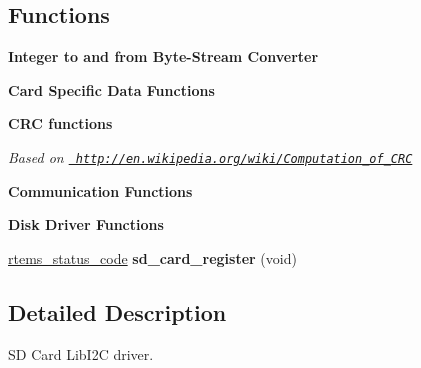 \subsection*{Functions}
\begin{Indent}\textbf{ Integer to and from Byte-\/\+Stream Converter}\par
\end{Indent}
\begin{Indent}\textbf{ Card Specific Data Functions}\par
\end{Indent}
\begin{Indent}\textbf{ C\+RC functions}\par
{\em Based on \href{http://en.wikipedia.org/wiki/Computation_of_CRC}{\texttt{ http\+://en.\+wikipedia.\+org/wiki/\+Computation\+\_\+of\+\_\+\+C\+RC}} }\end{Indent}
\begin{Indent}\textbf{ Communication Functions}\par
\end{Indent}
\begin{Indent}\textbf{ Disk Driver Functions}\par
\begin{DoxyCompactItemize}
\item 
\mbox{\label{spi-sd-card_8c_aaaf1cf315366ca6aed59e4bece3e03da}} 
\mbox{\hyperlink{group__ClassicStatus_ga545d41846817eaba6143d52ee4d9e9fe}{rtems\+\_\+status\+\_\+code}} {\bfseries sd\+\_\+card\+\_\+register} (void)
\end{DoxyCompactItemize}
\end{Indent}


\subsection{Detailed Description}
SD Card Lib\+I2C driver. 

